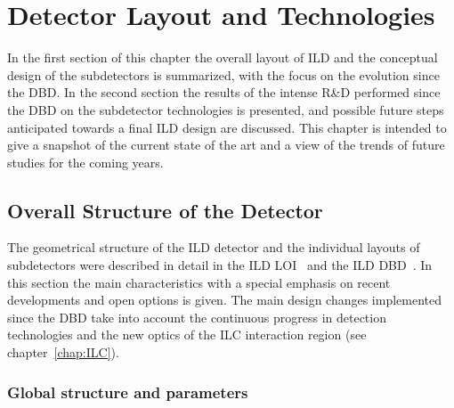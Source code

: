 \newcommand{\ilds}[1]{{\em#1}$^s$} %

\chapter{Detector Layout and Technologies}
\label{chap:technologies}

In the first section of this chapter the overall layout of ILD and the conceptual design of the subdetectors is summarized, with the focus on the evolution since the DBD. In the second section the results of the intense R\&D performed since the DBD on the subdetector technologies is presented, and possible future steps anticipated towards a final ILD design are discussed. This chapter is intended to give a snapshot of the current state of the art and a view of the trends of future studies for the coming years.      
\section{Overall Structure of the Detector}

The geometrical structure of the ILD detector and the individual layouts of subdetectors were described in detail in the ILD LOI~\cite{ild:bib:ILDloi} and the ILD DBD~\cite{ild:bib:ilddbd}. In this section the main characteristics with a special emphasis on recent developments and open options is given. The main design changes implemented since the DBD take into account the continuous progress in detection technologies and the new optics of the ILC interaction region (see chapter~\ref{chap:ILC}). 


\subsection{Global structure and parameters}




